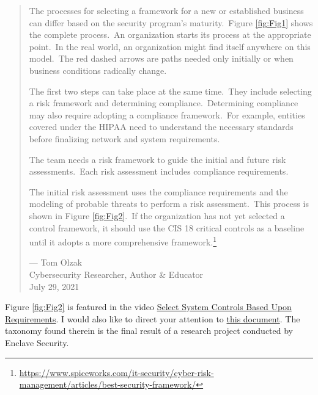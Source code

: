 \begin{formal}
    
    \begin{quote} 
    \begin{minipage}{\linewidth}
    \renewcommand\thempfootnote{\textcolor{orange}{\arabic{footnote}}}
    \setlength\parindent{15pt}
    
\par The processes for selecting a framework for a new or established business can differ based on the security program’s maturity.\ Figure \ref{fig:Fig1} shows the complete process.\ An organization starts its process at the appropriate point.\ In the real world, an organization might find itself anywhere on this model.\ The red dashed arrows are paths needed only initially or when business conditions radically change.\hfill
\vspace{10pt}
\par The first two steps can take place at the same time.\ They include selecting a risk framework and determining compliance.\ Determining compliance may also require adopting a compliance framework.\ For example, entities covered under the HIPAA need to understand the necessary standards before finalizing network and system requirements.\hfill
\vspace{10pt}   

\par The team needs a risk framework to guide the initial and future risk assessments.\ Each risk assessment includes compliance requirements.\hfill
\vspace{10pt} 

\par The initial risk assessment uses the compliance requirements and the modeling of probable threats to perform a risk assessment.\ This process is shown in Figure \ref{fig:Fig2}.\ If the organization has not yet selected a control framework, it should use the CIS 18 critical controls as a baseline until it adopts a more comprehensive framework.\footnote{\url{https://www.spiceworks.com/it-security/cyber-risk-management/articles/best-security-framework/}}

\begin{flushright}
--- Tom Olzak\\ 
Cybersecurity Researcher, Author \& Educator\\
July 29, 2021
\end{flushright}
\vspace{10pt}

    
    \end{minipage}
    \end{quote}

\end{formal}

Figure \ref{fig:Fig2} is featured in the video \href{https://www.youtube.com/watch?v=vKFtEt_i62o}{Select System Controls Based Upon Requirements}. I would also like to direct your attention to \href{https://www.auditscripts.com/resources/open_threat_taxonomy_v1.1a.pdf}{this document}. The taxonomy found therein is the final result of a research project conducted by Enclave Security. 

\cleardoublepage
